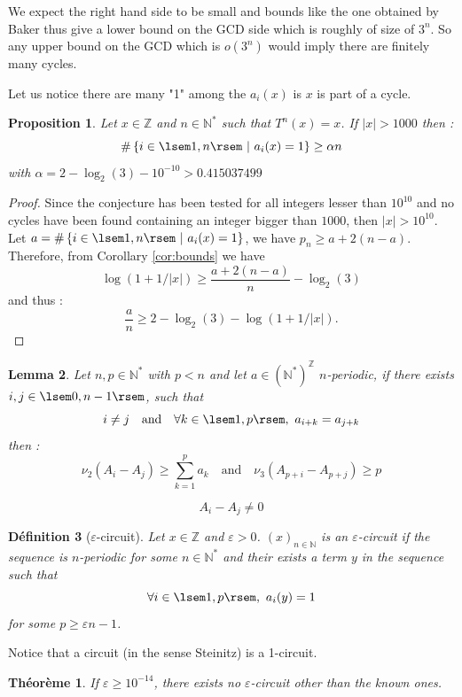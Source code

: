\documentclass[12pt,a4paper]{article}
\newtheorem{lem}{Lemma}[section]
\newtheorem{prop}[lem]{Proposition}
\newtheorem{defi}[lem]{Définition}
\newtheorem{theo}{Théorème}
\def\NN{\mathbb{N}}
\def\ZZ{\mathbb{Z}}
\begin{document}
We expect the right hand side to be small and bounds like the one obtained by Baker thus give a lower bound on the GCD side which is roughly of size of $3^n$. So any upper bound on the GCD which is $o(3^n)$ would imply there are finitely many cycles. 

Let us notice there are many "1" among the $a_i(x)$ is $x$ is part of a cycle. 

\begin{prop}\label{prop:proposition} Let $x\in \ZZ$  and $n\in \NN^*$ such that $T^n(x)=x$. 
If $|x|>1000$ then : 
$$ \#\left\{i\in \lsem 1,n\rsem ~|~ a_i(x) =1\right\} \geq \alpha n $$
with $\alpha = 2-\log_2(3)-10^{-10}> 0.415037499$

\end{prop}
\begin{proof}
Since the conjecture has been tested for all integers lesser than $10^{10}$ and no cycles have been found containing an integer bigger than $1000$, then $|x|>10^{10}$. Let $a=\#\left\{i\in \lsem 1,n\rsem  ~|~ a_i(x) =1\right\} $, we have $p_n\geq a+2(n-a)$. Therefore, from Corollary \ref{cor:bounds} we  have 
$$ \log(1+1/|x|) \geq \frac{a+2(n-a)}{n} - \log_2(3)$$
and thus :
$$ \frac{a}{n} \geq 2-\log_2(3)-\log(1+1/|x|). $$

\end{proof}
\begin{lem}\label{lem:periodic_exists_i_a_i_} Let $n,p\in\NN^*$ with $p< n$ and let $a \in (\NN^*)^\ZZ$ $n$-periodic, if there exists $i,j\in \lsem 0,n-1\rsem$, such that $$i\neq j\quad \text{and}\quad \forall k\in\lsem 1,p\rsem,~  a_{i+k}=a_{j+k} $$
then :
$$ \nu_2(A_i-A_j)\geq \sum_{k=1}^p a_k \quad \text{and}\quad  \nu_3(A_{p+i}-A_{p+j})\geq p  $$

$$A_i- A_j \neq 0 $$
\end{lem}
\begin{defi}[$\varepsilon$-circuit]\label{def:circuit} Let $x\in \ZZ$ and $\varepsilon>0$. $\left(x\right)_{n\in\NN}$ is an $\varepsilon$-circuit if the sequence is $n$-periodic for some 
$n\in\NN^*$ and their exists a term $y$ in the sequence such that $$\forall i \in \lsem
 1,p\rsem,~a_i(y)=1$$
for some $p\geq \varepsilon n-1$.
\end{defi}
Notice that a circuit (in the sense Steinitz) is a 1-circuit.
\begin{theo}\label{theo:exists_no_circuit_other} If $\varepsilon\geq 10^{-14}$, there exists no $\varepsilon$-circuit other than the known ones.
\end{theo}
\end{document}
